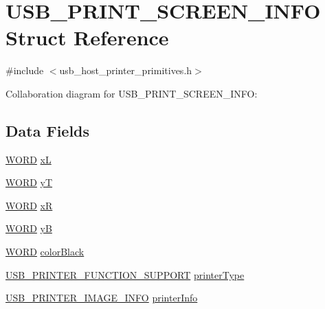 \hypertarget{struct_u_s_b___p_r_i_n_t___s_c_r_e_e_n___i_n_f_o}{}\section{U\+S\+B\+\_\+\+P\+R\+I\+N\+T\+\_\+\+S\+C\+R\+E\+E\+N\+\_\+\+I\+N\+F\+O Struct Reference}
\label{struct_u_s_b___p_r_i_n_t___s_c_r_e_e_n___i_n_f_o}


{\ttfamily \#include $<$usb\+\_\+host\+\_\+printer\+\_\+primitives.\+h$>$}



Collaboration diagram for U\+S\+B\+\_\+\+P\+R\+I\+N\+T\+\_\+\+S\+C\+R\+E\+E\+N\+\_\+\+I\+N\+F\+O\+:
\subsection*{Data Fields}
\begin{DoxyCompactItemize}
\item 
\hyperlink{_generic_type_defs_8h_a2b0e863dadf920709ec53d9088ee7c91}{W\+O\+R\+D} \hyperlink{struct_u_s_b___p_r_i_n_t___s_c_r_e_e_n___i_n_f_o_aada8306cbdf26e506656fef86efd5374}{x\+L}
\item 
\hyperlink{_generic_type_defs_8h_a2b0e863dadf920709ec53d9088ee7c91}{W\+O\+R\+D} \hyperlink{struct_u_s_b___p_r_i_n_t___s_c_r_e_e_n___i_n_f_o_a949864b828dc476d6108029a6586084d}{y\+T}
\item 
\hyperlink{_generic_type_defs_8h_a2b0e863dadf920709ec53d9088ee7c91}{W\+O\+R\+D} \hyperlink{struct_u_s_b___p_r_i_n_t___s_c_r_e_e_n___i_n_f_o_a0feea1fb4c8ce38636c979c21274d699}{x\+R}
\item 
\hyperlink{_generic_type_defs_8h_a2b0e863dadf920709ec53d9088ee7c91}{W\+O\+R\+D} \hyperlink{struct_u_s_b___p_r_i_n_t___s_c_r_e_e_n___i_n_f_o_a75f3fc106ada28aab0c4a192326006c8}{y\+B}
\item 
\hyperlink{_generic_type_defs_8h_a2b0e863dadf920709ec53d9088ee7c91}{W\+O\+R\+D} \hyperlink{struct_u_s_b___p_r_i_n_t___s_c_r_e_e_n___i_n_f_o_a9747cd12a436ba63508aceff8383bd49}{color\+Black}
\item 
\hyperlink{union_u_s_b___p_r_i_n_t_e_r___f_u_n_c_t_i_o_n___s_u_p_p_o_r_t}{U\+S\+B\+\_\+\+P\+R\+I\+N\+T\+E\+R\+\_\+\+F\+U\+N\+C\+T\+I\+O\+N\+\_\+\+S\+U\+P\+P\+O\+R\+T} \hyperlink{struct_u_s_b___p_r_i_n_t___s_c_r_e_e_n___i_n_f_o_a129a24785c338439a671a7bcdc4880c7}{printer\+Type}
\item 
\hyperlink{struct_u_s_b___p_r_i_n_t_e_r___i_m_a_g_e___i_n_f_o}{U\+S\+B\+\_\+\+P\+R\+I\+N\+T\+E\+R\+\_\+\+I\+M\+A\+G\+E\+\_\+\+I\+N\+F\+O} \hyperlink{struct_u_s_b___p_r_i_n_t___s_c_r_e_e_n___i_n_f_o_aa76de7879c596846e7455216b108b386}{printer\+Info}
\end{DoxyCompactItemize}


